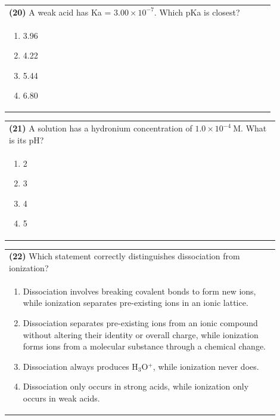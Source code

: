 \documentclass{article}
\begin{document}
\noindent\begin{tabular}{|p{0.9\linewidth}|}
\hline
\textbf{(20)} A weak acid has Ka = $3.00\times10^{-7}$. Which pKa is closest? \\[0.2cm]
\begin{minipage}{0.85\linewidth}
\begin{enumerate}[label=\alph*.]
\item 3.96 \item 4.22 \item 5.44 \item 6.80
\end{enumerate}
\end{minipage}\\[0.2cm]
\hline
\end{tabular}
\newpage

\noindent\begin{tabular}{|p{0.9\linewidth}|}
\hline
\textbf{(21)} A solution has a hydronium concentration of $1.0\times10^{-4}\ \text{M}$. What is its pH? \\[0.2cm]
\begin{minipage}[t]{0.85\linewidth}
\begin{enumerate}[label=\alph*.]
\item 2 \item 3 \item 4 \item 5
\end{enumerate}
\end{minipage}\\[0.2cm]
\hline
\end{tabular}

\noindent\begin{tabular}{|p{0.9\linewidth}|}
\hline
\textbf{(22)} Which statement correctly distinguishes dissociation from ionization? \\[0.2cm]
\begin{minipage}{0.85\linewidth}
\begin{enumerate}[label=\alph*.]
\item Dissociation involves breaking covalent bonds to form new ions, while ionization separates pre-existing ions in an ionic lattice.
\item Dissociation separates pre-existing ions from an ionic compound without altering their identity or overall charge, while ionization forms ions from a molecular substance through a chemical change.
\item Dissociation always produces H$_3$O$^+$, while ionization never does.
\item Dissociation only occurs in strong acids, while ionization only occurs in weak acids.
\end{enumerate}
\end{minipage}\\[0.2cm]
\hline
\end{tabular}
\end{document}
